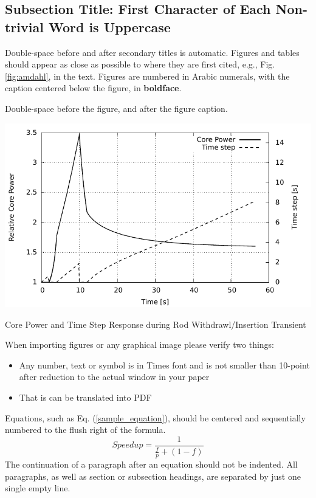 \documentclass{ansconf}
\begin{document}
\begin{multicols}{2}
\subsection{Subsection Title: First Character of Each Non-trivial Word is 
Uppercase} 
\label{sec:second}

Double-space before and after secondary titles is automatic.  Figures and 
tables should appear as close as possible to where they are first
cited, e.g., Fig. \ref{fig:amdahl}, in the text.  Figures are numbered in 
Arabic numerals, with the caption centered below the figure, in 
{\bf boldface}.
  
Double-space before the figure, and after the figure caption.

%
\vspace{8pt}
\begin{figurehere}
\begin{spacing}{1.0}
\centering
\includegraphics[scale=0.65]{figure}
\caption{\small Core Power and Time Step Response during Rod 
          Withdrawl/Insertion Transient}
\label{fig:amdahl}
\end{spacing}
\end{figurehere}
\vspace{8pt}
%

When importing figures or any graphical image please verify two things:
\begin{itemize}
\item Any number, text or symbol is in Times font and is not smaller than 
    10-point after reduction to the actual window in your paper
\item That is can be translated into PDF
\end{itemize}


Equations, such as Eq. (\ref{sample_equation}), should be centered and 
sequentially numbered to the flush right of the formula.
\begin{equation}
  \label{sample_equation}
  Speedup = \frac{1}{\frac{f}{p} + (1-f)}
\end{equation}
The continuation of a paragraph after an equation should not be indented.  
All paragraphs, as well as section or subsection headings, are separated by 
just one single empty line.



\end{multicols}
\end{document}
